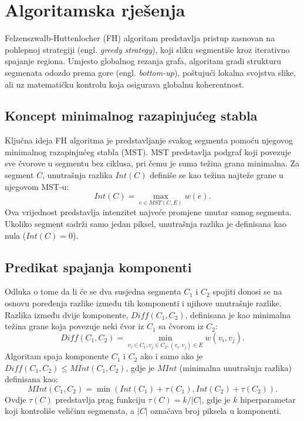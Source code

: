 \documentclass[11pt,a4paper]{article}
\begin{document}

\section{Algoritamska rješenja}

Felzenszwalb-Huttenlocher (FH) algoritam predstavlja pristup zasnovan na pohlepnoj strategiji (engl. \textit{greedy strategy}), koji sliku segmentiše kroz iterativno spajanje regiona. Umjesto globalnog rezanja grafa, algoritam gradi strukturu segmenata odozdo prema gore (engl. \textit{bottom-up}), poštujući lokalna svojstva slike, ali uz matematičku kontrolu koja osigurava globalnu koherentnost.

\subsection{Koncept minimalnog razapinjućeg stabla}
Ključna ideja FH algoritma je predstavljanje svakog segmenta pomoću njegovog minimalnog razapinjućeg stabla (MST). MST predstavlja podgraf koji povezuje sve čvorove u segmentu bez ciklusa, pri čemu je suma težina grana minimalna. Za segment $C$, unutrašnja razlika $Int(C)$ definiše se kao težina najteže grane u njegovom MST-u:
\begin{equation}
    Int(C) = \max_{e \in MST(C, E)} w(e).
\end{equation}
Ova vrijednost predstavlja intenzitet najveće promjene unutar samog segmenta. Ukoliko segment sadrži samo jedan piksel, unutrašnja razlika je definisana kao nula ($Int(C) = 0$).

\subsection{Predikat spajanja komponenti}
Odluka o tome da li će se dva susjedna segmenta $C_1$ i $C_2$ spojiti donosi se na osnovu poređenja razlike između tih komponenti i njihove unutrašnje razlike. Razlika između dvije komponente, $Diff(C_1, C_2)$, definisana je kao minimalna težina grane koja povezuje neki čvor iz $C_1$ sa čvorom iz $C_2$:
\begin{equation}
    Diff(C_1, C_2) = \min_{v_i \in C_1, v_j \in C_2, (v_i, v_j) \in E} w(v_i, v_j).
\end{equation}
Algoritam spaja komponente $C_1$ i $C_2$ ako i samo ako je $Diff(C_1, C_2) \le MInt(C_1, C_2)$, gdje je $MInt$ (minimalna unutrašnja razlika) definisana kao:
\begin{equation}
    MInt(C_1, C_2) = \min(Int(C_1) + \tau(C_1), Int(C_2) + \tau(C_2)).
\end{equation}
Ovdje $\tau(C)$ predstavlja prag funkciju $\tau(C) = k / |C|$, gdje je $k$ hiperparametar koji kontroliše veličinu segmenata, a $|C|$ označava broj piksela u komponenti.
\end{document}
